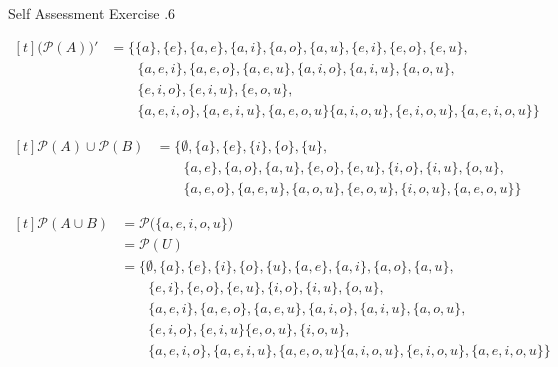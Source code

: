 \documentclass[\main/notes.tex]{subfiles}
\begin{document}
\begin{exercise}{Self Assessment Exercise \thechapter.6}
\begin{questions}
\begin{questions}[labelsep=1em, first=\answer]
								$\begin{aligned}[t]
									\bigl(\mathcal{P}(A)\bigr)' &= \bigl\{\{a\}, \{e\}, \{a, e\}, \{a, i\}, \{a, o\}, \{a, u\}, \{e, i\}, \{e, o\}, \{e, u\},\\
									& \qquad \{a, e, i\}, \{a, e, o\}, \{a, e, u\}, \{a, i, o\}, \{a, i, u\}, \{a, o, u\}, \\
									& \qquad \{e, i, o\}, \{e, i, u\},  \{e, o, u\}, \\
									& \qquad \{a, e, i, o\}, \{a, e, i, u\}, \{a, e, o, u\} \{a, i, o, u\}, \{e, i, o, u\}, \{a, e, i, o, u\}\bigr\}
								\end{aligned} $
							\item $
								\begin{aligned}[t]
									\mathcal{P}(A) \cup \mathcal{P}(B) &= \bigl\{\emptyset, \{a\}, \{e\}, \{i\}, \{o\}, \{u\},\\
									& \qquad \{a, e\}, \{a, o\}, \{a, u\}, \{e, o\}, \{e, u\}, \{i, o\}, \{i, u\}, \{o, u\}, \\
									& \qquad \{a, e, o\}, \{a, e, u\}, \{a, o, u\}, \{e, o, u\}, \{i, o, u\}, \{a, e, o, u\}\bigr\}
								\end{aligned}$

								$\begin{aligned}[t]
									\mathcal{P}(A \cup B) &= \mathcal{P}\bigl(\{a, e, i, o, u\}\bigr)\\
									&= \mathcal{P}(U)\\
									&= \bigl\{\emptyset, \{a\}, \{e\}, \{i\}, \{o\}, \{u\}, \{a, e\}, \{a, i\}, \{a, o\}, \{a, u\},\\
									& \qquad \{e, i\}, \{e, o\}, \{e, u\}, \{i, o\}, \{i, u\}, \{o, u\},\\
									& \qquad \{a, e, i\}, \{a, e, o\}, \{a, e, u\}, \{a, i, o\}, \{a, i, u\}, \{a, o, u\},\\
									& \qquad \{e, i, o\}, \{e, i, u\} \{e, o, u\}, \{i, o, u\},\\
									& \qquad \{a, e, i, o\}, \{a, e, i, u\}, \{a, e, o, u\} \{a, i, o, u\}, \{e, i, o, u\}, \{a, e, i, o, u\}\bigr\}
								\end{aligned} $
						\end{questions}
				\end{questions}
			\end{exercise}
\end{document}
